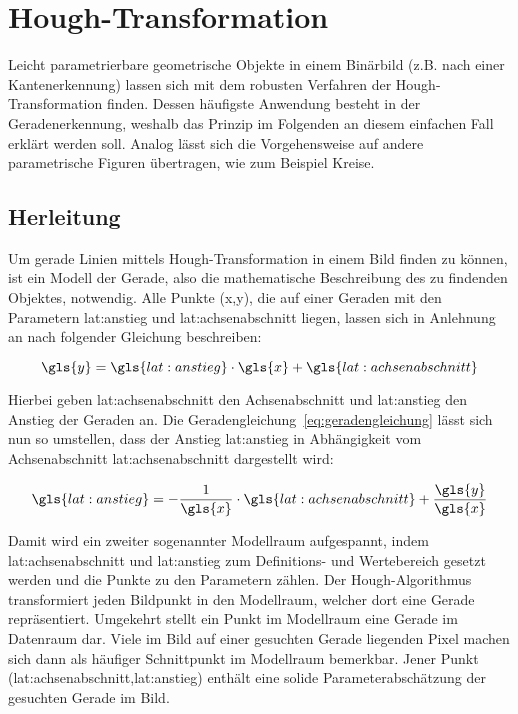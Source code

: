 \section{Hough-Transformation \dcfirstauthorshort}
\label{sec:grundlagen:hough}

Leicht parametrierbare geometrische Objekte in einem Binärbild (z.B. nach einer Kantenerkennung) lassen sich mit dem robusten Verfahren der Hough-Transformation finden. Dessen häufigste Anwendung besteht in der Geradenerkennung, weshalb das Prinzip im Folgenden an diesem einfachen Fall erklärt werden soll. Analog lässt sich die Vorgehensweise auf andere parametrische Figuren übertragen, wie zum Beispiel Kreise.

\subsection{Herleitung}
Um gerade Linien mittels Hough-Transformation in einem Bild finden zu können, ist ein Modell der Gerade, also die mathematische Beschreibung des zu findenden Objektes, notwendig. Alle Punkte (\gls{x},\gls{y}), die auf einer Geraden mit den Parametern \gls{lat:anstieg} und \gls{lat:achsenabschnitt} liegen, lassen sich in Anlehnung an \autocite[S.~481f]{jaehneDigitaleBildverarbeitungMit2005} nach folgender Gleichung beschreiben:

\begin{equation}
\gls{y} = \gls{lat:anstieg} \cdot \gls{x} + \gls{lat:achsenabschnitt}
\label{eq:geradengleichung}
\end{equation}

Hierbei geben \gls{lat:achsenabschnitt} den Achsenabschnitt und \gls{lat:anstieg} den Anstieg der Geraden an. Die Geradengleichung~\eqref{eq:geradengleichung} lässt sich nun so umstellen, dass der Anstieg \gls{lat:anstieg} in Abhängigkeit vom Achsenabschnitt \gls{lat:achsenabschnitt}  dargestellt wird:

\begin{equation}
\gls{lat:anstieg} = -\frac{1}{\gls{x}} \cdot \gls{lat:achsenabschnitt} + \frac{\gls{y}}{\gls{x}}
\end{equation}

Damit wird ein zweiter sogenannter Modellraum aufgespannt, indem \gls{lat:achsenabschnitt} und \gls{lat:anstieg} zum Definitions- und Wertebereich gesetzt werden und die Punkte zu den Parametern zählen. Der Hough-Algorithmus transformiert jeden Bildpunkt in den Modellraum, welcher dort eine Gerade repräsentiert. Umgekehrt stellt ein Punkt im Modellraum eine Gerade im Datenraum dar. Viele im Bild auf einer gesuchten Gerade liegenden Pixel machen sich dann als häufiger Schnittpunkt im Modellraum bemerkbar. Jener Punkt (\gls{lat:achsenabschnitt},\gls{lat:anstieg}) enthält eine solide Parameterabschätzung der gesuchten Gerade im Bild.


